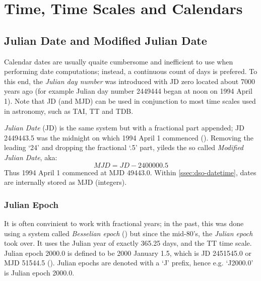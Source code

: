 \chapter{Time, Time Scales and Calendars}
\label{ch:time-scales}

\section{Julian Date and Modified Julian Date}
\label{sec:julian-date}
Calendar dates are usually quaite cumbersome and inefficient to use when 
performing date computations; instead, a continuous count of days is prefered. 
To this end, the \emph{Julian day number} was introduced with JD zero located 
about 7000 years ago (for example Julian day number 2449444 began at noon on 
1994 April 1). Note that JD (and MJD) can be used in conjunction to most 
time scales used in astronomy, such as TAI, TT and TDB.

\emph{Julian Date} (JD) is the same system but with a fractional part appended; JD 2449443.5 was the
midnight on which 1994 April 1 commenced (\cite{sofa_18161_tscb}). Removing the leading 
`24' and dropping the fractional `.5' part, yileds the so called \emph{Modified Julian Date}, 
aka:
\begin{equation}
    MJD = JD - 2400000.5
\end{equation}
Thus 1994 April 1 commenced at MJD 49443.0. Within \ref{ssec:dso-datetime}, dates are 
internally stored as MJD (integers).

\subsection{Julian Epoch}
It is often convinient to work with fractional years; in the past, this was done 
using a system called \emph{Besselian epoch} (\cite{sofa_18161_tscb}) but since the 
mid-80's, the \emph{Julian epoch} took over. It uses the Julian year of exactly 365.25 days,
and the TT time scale. Julian epoch 2000.0 is defined to be 2000 January 1.5, which
is JD 2451545.0 or MJD 51544.5 (\cite{sofa_18161_tscb}). Julian epochs are denoted with 
a `J' prefix, hence e.g. `J2000.0' is Julian epoch 2000.0.


